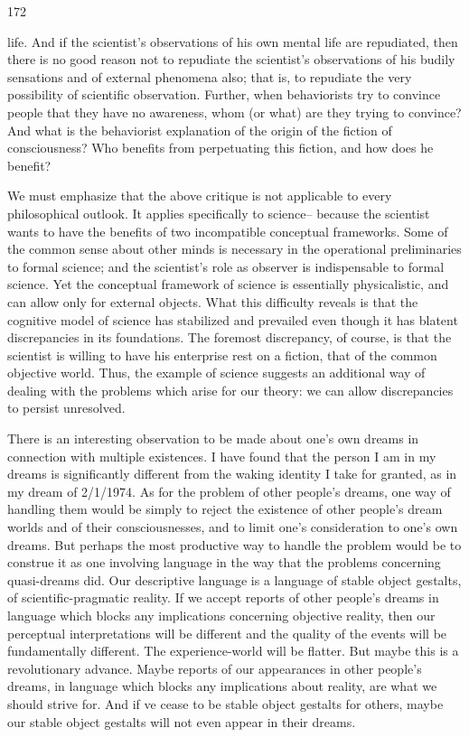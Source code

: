 \documentclass[10pt,twoside]{memoir}
\begin{document}
\begin{enumerate}
{{172 


life. And if the scientist's observations of his own mental life are repudiated, 
then there is no good reason not to repudiate the scientist's observations of 
his budily sensations and of external phenomena also; that is, to repudiate 
the very possibility of scientific observation. Further, when behaviorists try 
to convince people that they have no awareness, whom (or what) are they 
trying to convince? And what is the behaviorist explanation of the origin of 
the fiction of consciousness? Who benefits from perpetuating this fiction, 
and how does he benefit? 

We must emphasize that the above critique is not applicable to every 
philosophical outlook. It applies specifically to science-- because the scientist 
wants to have the benefits of two incompatible conceptual frameworks. 
Some of the common sense about other minds is necessary in the operational 
preliminaries to formal science; and the scientist's role as observer is 
indispensable to formal science. Yet the conceptual framework of science is 
essentially physicalistic, and can allow only for external objects. What this 
difficulty reveals is that the cognitive model of science has stabilized and 
prevailed even though it has blatent discrepancies in its foundations. The 
foremost discrepancy, of course, is that the scientist is willing to have his 
enterprise rest on a fiction, that of the common objective world. Thus, the 
example of science suggests an additional way of dealing with the problems 
which arise for our theory: we can allow discrepancies to persist unresolved. 

There is an interesting observation to be made about one's own dreams 
in connection with multiple existences. I have found that the person I am in 
my dreams is significantly different from the waking identity I take for 
granted, as in my dream of 2/1/1974. As for the problem of other people's 
dreams, one way of handling them would be simply to reject the existence of 
other people's dream worlds and of their consciousnesses, and to limit one's 
consideration to one's own dreams. But perhaps the most productive way to 
handle the problem would be to construe it as one involving language in the 
way that the problems concerning quasi-dreams did. Our descriptive language 
is a language of stable object gestalts, of scientific-pragmatic reality. If we 
accept reports of other people's dreams in language which blocks any 
implications concerning objective reality, then our perceptual interpretations 
will be different and the quality of the events will be fundamentally 
different. The experience-world will be flatter. But maybe this is a 
revolutionary advance. Maybe reports of our appearances in other people's 
dreams, in language which blocks any implications about reality, are what we 
should strive for. And if ve cease to be stable object gestalts for others, 
maybe our stable object gestalts will not even appear in their dreams. 


}}
\end{enumerate}
\end{document}
